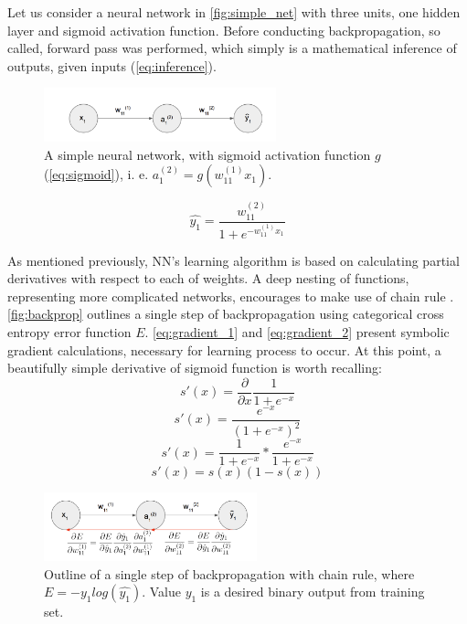 \documentclass[11pt, a4paper]{article}
\begin{document}
Let us consider a neural network in \autoref{fig:simple_net} with three units, one hidden layer and sigmoid activation function. Before conducting backpropagation, so called, forward pass was performed, which simply is a mathematical inference of outputs, given inputs (\autoref{eq:inference}).\\

\begin{figure}[h]
\includegraphics[width=0.6\textwidth]{simple_net}
\centering
\caption[Prosta sieć neuronowa z funkcją aktywacyjną sigmoid]{A simple neural network, with sigmoid activation function $g$ (\autoref{eq:sigmoid}), i. e. $a_1^{(2)}=g(w_{11}^{(1)}x_1)$.}
\label{fig:simple_net}
\end{figure}

\begin{equation} \label{eq:inference}
\hat{y_1} = \frac{w_{11}^{(2)}}{1 + e^{-w_{11}^{(1)}x_1}}
\end{equation}

As mentioned previously, NN's learning algorithm is based on calculating partial derivatives with respect to each of weights. A deep nesting of functions, representing more complicated networks, encourages to make use of chain rule \cite{chain_rule_def}. \autoref{fig:backprop} outlines a single step of backpropagation using categorical cross entropy error function $E$. \autoref{eq:gradient_1} and \autoref{eq:gradient_2} present symbolic gradient calculations, necessary for learning process to occur. At this point, a beautifully simple derivative of sigmoid function is worth recalling:
\[ s'(x) = \frac{\partial}{\partial x}\frac{1}{1 + e^{-x}}\]
\[s'(x) = \frac{e^{-x}}{(1 + e^{-x})^2} \]
\[s'(x) = \frac{1}{1 + e^{-x}} * \frac{e^{-x}}{1 + e^{-x}}\]
\[ s'(x) = s(x)(1 - s(x))\]

\begin{figure}[h]
\includegraphics[width=0.55\textwidth]{backprop}
\centering
\caption[Propagacja wsteczna przy użyciu reguły łańcuchowej]{Outline of a single step of backpropagation with chain rule, where $E=-y_1log(\hat{y_1})$. Value $y_1$ is a desired binary output from training set.}
\label{fig:backprop}
\end{figure}
\end{document}
